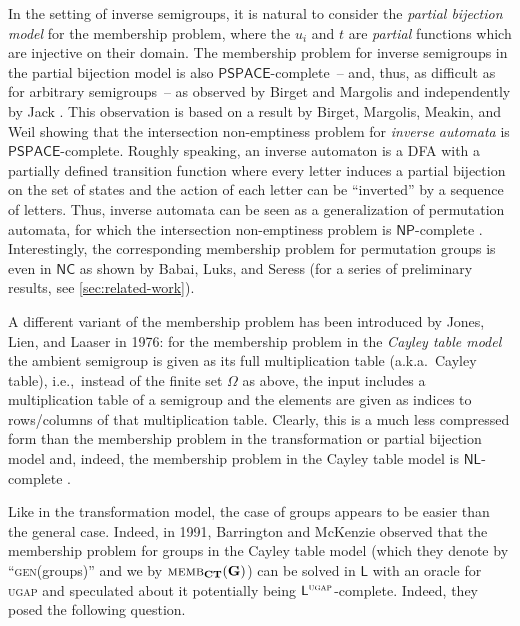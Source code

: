 \documentclass[anonymous,letter,UKenglish,cleveref,autoref,thm-restate]{lipics-v2021}
\newcommand{\ie}{i.e.,~}
\newcommand{\NC}{\ensuremath{\mathsf{NC}}\xspace}
\newcommand{\LOGSPACE}{\ensuremath{\mathsf{L}}\xspace}
\newcommand{\NL}{\ensuremath{\mathsf{NL}}\xspace}
\newcommand{\NP}{\ensuremath{\mathsf{NP}}\xspace}
\newcommand{\PSPACE}{\ensuremath{\mathsf{PSPACE}}\xspace}
\renewcommand{\L}{\LOGSPACE}
\newcommand{\vG}{\ensuremath{\mathbf{G}}}
\theoremstyle{plain}
\theoremstyle{plain}
\newcommand{\dMemb}[2][]{\textup{\textsc{memb${}_{\mathbf{#1}}\expandafter\ifx\expandafter\relax\detokenize{#2}\relax\else(#2)\fi$}}}
\newcommand{\prob}[1]{\textup{\textsc{#1}}\xspace}
\newcommand{\dUGAP}{\prob{ugap}}
\begin{document}
In the setting of inverse semigroups, it is natural to consider the \emph{partial bijection model} for the membership problem, where the $u_i$ and $t$ are \emph{partial} functions which are injective on their domain.
The membership problem for inverse semigroups in the partial bijection model is also \PSPACE-complete~-- and, thus, as difficult as for arbitrary semigroups~-- as observed by Birget and Margolis \cite{BirgetM08} and independently by Jack \cite{Jack23}.
This observation is based on a result by Birget, Margolis, Meakin, and Weil \cite{BirgetMMW94} showing that the intersection non-emptiness problem for \emph{inverse automata} is \PSPACE-complete.
Roughly speaking, an inverse automaton is a DFA with a partially defined transition function where every letter induces a partial bijection on the set of states and the action of each letter can be ``inverted'' by a sequence of letters. 
Thus, inverse automata can be seen as a generalization of permutation automata, for which the intersection non-emptiness problem is \NP-complete \cite{BlondinKM12}.
Interestingly, the corresponding membership problem for permutation groups is even in \NC as shown by Babai, Luks, and Seress \cite{BabaiLS87} (for a series of preliminary results, see \cref{sec:related-work}).

\medbreak

A different variant of the membership problem has been introduced by Jones, Lien, and Laaser \cite{JonesLL76} in 1976: for the membership problem  in the \emph{Cayley table model} the ambient semigroup is given as its full multiplication table (a.k.a.\ Cayley table), \ie instead of the finite set $\Omega$ as above, the input includes a multiplication table of a semigroup and the elements are given as indices to rows/columns of that multiplication table. 
Clearly, this is a much less compressed form than the membership problem in the transformation or partial bijection model and, indeed, the membership problem  in the Cayley table model is \NL-complete \cite{JonesLL76}.

Like in the transformation model, the case of groups appears to be easier than the general case.
Indeed, in 1991, Barrington and McKenzie \cite{BarringtonM91} observed that the membership problem for groups in the Cayley table model (which they denote by ``\textsc{gen}(groups)'' and we by $\dMemb[CT]{\vG}$) can be solved in \L with an oracle for \dUGAP and speculated about it potentially being $\LOGSPACE^\dUGAP$-complete.
Indeed, they posed the following question.
\end{document}
